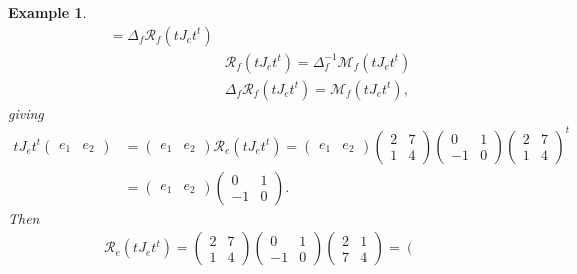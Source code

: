 \documentclass[aps,preprint]{revtex4}
\newtheorem{example}[theorem]{Example}
\begin{document}
\begin{example}
\begin{align}
=\Delta _{f}\mathcal{R}_{f}\left( tJ_{e}t^{t}\right) \\
& \mathcal{R}_{f}\left( tJ_{e}t^{t}\right) =\Delta _{f}^{-1}\mathcal{M}%
_{f}\left( tJ_{e}t^{t}\right) \\
& \Delta _{f}\mathcal{R}_{f}\left( tJ_{e}t^{t}\right) =\mathcal{M}_{f}\left(
tJ_{e}t^{t}\right) ,
\end{align}%
giving%
\begin{align}
tJ_{e}t^{t}\left( 
\begin{array}{cc}
e_{1} & e_{2}%
\end{array}%
\right) & =\left( 
\begin{array}{cc}
e_{1} & e_{2}%
\end{array}%
\right) \mathcal{R}_{e}\left( tJ_{e}t^{t}\right) =\left( 
\begin{array}{cc}
e_{1} & e_{2}%
\end{array}%
\right) \left( 
\begin{array}{cc}
2 & 7 \\ 
1 & 4%
\end{array}%
\right) \left( 
\begin{array}{cc}
0 & 1 \\ 
-1 & 0%
\end{array}%
\right) \left( 
\begin{array}{cc}
2 & 7 \\ 
1 & 4%
\end{array}%
\right) ^{t} \\
& =\left( 
\begin{array}{cc}
e_{1} & e_{2}%
\end{array}%
\right) \left( 
\begin{array}{cc}
0 & 1 \\ 
-1 & 0%
\end{array}%
\right) .
\end{align}%
Then%
\begin{align}
& \mathcal{R}_{e}\left( tJ_{e}t^{t}\right) =\left( 
\begin{array}{cc}
2 & 7 \\ 
1 & 4%
\end{array}%
\right) \left( 
\begin{array}{cc}
0 & 1 \\ 
-1 & 0%
\end{array}%
\right) \left( 
\begin{array}{cc}
2 & 1 \\ 
7 & 4%
\end{array}%
\right) =\left( 
\begin{array}{cc}

\end{array}
\end{align}
\end{example}
\end{document}
